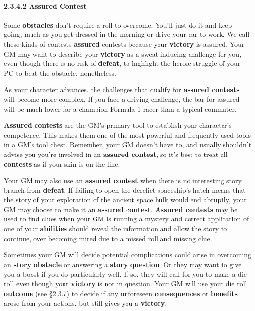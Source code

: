 \documentclass[
  11pt,
]{article}
\begin{document}
\hypertarget{assured-contest}{%
\paragraph{2.3.4.2 Assured Contest}\label{assured-contest}}

Some \textbf{obstacles} don't require a roll to overcome. You'll just do
it and keep going, much as you get dressed in the morning or drive your
car to work. We call these kinds of contests \textbf{assured} contests
because your \textbf{victory} is assured. Your GM may want to describe
your \textbf{victory} as a sweat inducing challenge for you, even though
there is no risk of \textbf{defeat}, to highlight the heroic struggle of
your PC to beat the obstacle, nonetheless.

As your character advances, the challenges that qualify for
\textbf{assured contests} will become more complex. If you face a
driving challenge, the bar for assured will be much lower for a champion
Formula 1 racer than a typical commuter.

\textbf{Assured contests} are the GM's primary tool to establish your
character's competence. This makes them one of the most powerful and
frequently used tools in a GM's tool chest. Remember, your GM doesn't
have to, and usually shouldn't advise you you're involved in an
\textbf{assured contest}, so it's best to treat all \textbf{contests} as
if your skin is on the line.

Your GM may also use an \textbf{assured contest} when there is no
interesting story branch from \textbf{defeat}. If failing to open the
derelict spaceship's hatch means that the story of your exploration of
the ancient space hulk would end abruptly, your GM may choose to make it
an \textbf{assured contest}. \textbf{Assured contests} may be used to
find clues when your GM is running a mystery and correct application of
one of your \textbf{abilities} should reveal the information and allow
the story to continue, over becoming mired due to a missed roll and
missing clue.

Sometimes your GM will decide potential complications could arise in
overcoming an \textbf{story obstacle} or answering a \textbf{story
question}. Or they may want to give you a boost if you do particularly
well. If so, they will call for you to make a die roll even though your
\textbf{victory} is not in question. Your GM will use your die roll
\textbf{outcome} (see §2.3.7) to decide if any unforeseen
\textbf{consequences} or \textbf{benefits} arose from your actions, but
still gives you a \textbf{victory}.
\end{document}
